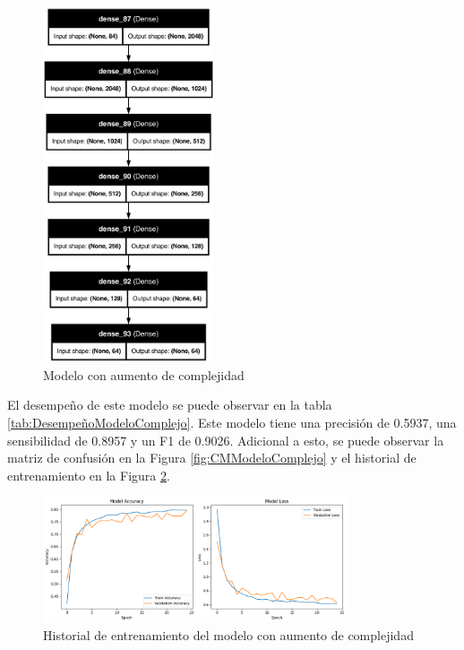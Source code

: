 \begin{figure}[H]
    \centering
    \includegraphics[width=0.45\textwidth]{figuras/modelComplex.png}
    \caption{Modelo con aumento de complejidad}
    \label{fig:ModeloComplejo}
\end{figure}

El desempeño de este modelo se puede observar en la tabla \ref{tab:DesempeñoModeloComplejo}.
Este modelo tiene una precisión de 0.5937, una sensibilidad de 0.8957 y un F1 de 0.9026.
Adicional a esto, se puede observar la matriz de confusión en la Figura \ref{fig:CMModeloComplejo} y el historial de entrenamiento en la Figura \ref{fig:HistoryModeloComplejo}.

\begin{figure}[H]
    \centering
    \includegraphics[width=0.8\textwidth]{figuras/modelComplexHistory.png}
    \caption{Historial de entrenamiento del modelo con aumento de complejidad}
    \label{fig:HistoryModeloComplejo}
\end{figure}

